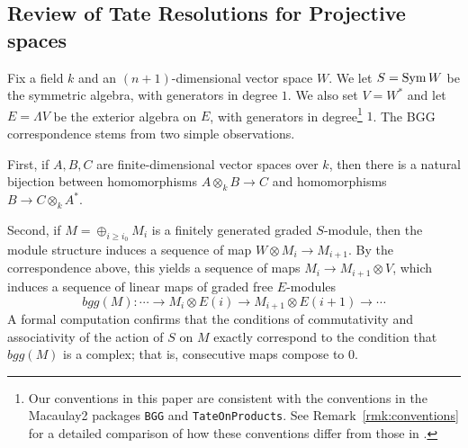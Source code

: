 \documentclass[twoside,12pt, leqno]{amsart}
\def\daniel#1{{\bf *** Daniel:} #1 {\bf ***}}
\begin{document}
\subsection{Review of Tate Resolutions for Projective spaces}
Fix a field $k$ and an $(n+1)$-dimensional vector space $W$.  We let $S=\operatorname{Sym} W$ be the symmetric algebra, with generators in degree $1$.  We also set $V=W^*$ and let $E=\Lambda V$ be the exterior algebra on $E$, with generators in degree\footnote{Our conventions in this paper are consistent with the conventions in the Macaulay2 packages {\tt BGG} and {\tt TateOnProducts}.  See Remark~\ref{rmk:conventions} for a detailed comparison of how these conventions differ from those in \cite{EFS,EES}.}  $1$.   The BGG correspondence stems from two simple observations.


First, if $A, B, C$ are finite-dimensional vector spaces over $k$, then there is a natural bijection between  homomorphisms $A\otimes_kB\to C$ and homomorphisms
$ B \to C\otimes_k A^*$.

Second, if $M = \oplus_{i\geq i_0} M_i$ is a finitely generated graded $S$-module, then the module structure induces a sequence of map $W\otimes M_i \to M_{i+1}$.  By the correspondence above, this yields a sequence of maps $M_i\to M_{i+1}\otimes V$, which induces a sequence of
linear maps of graded free $E$-modules 
$$ 
bgg(M): \cdots \to M_i\otimes E(i) \to M_{i+1}\otimes E(i+1) \to \cdots
$$
A formal computation confirms that the conditions of commutativity and associativity of the action of $S$ on $M$ exactly correspond to the condition that $bgg(M)$ is a complex; that is, consecutive maps compose to 0.
\end{document}
